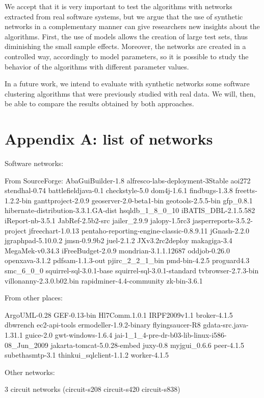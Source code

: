 We accept that it is very important to test the algorithms with networks
extracted from real software systems, but we argue that the use of synthetic
networks in a complementary manner can give researchers new insights about the
algorithms. First, the use of models allows the creation of large test sets,
thus diminishing the small sample effects. Moreover, the networks are created in
a controlled way, accordingly to model parameters, so it is possible to study
the behavior of the algorithms with different parameter values.

In a future work, we intend to evaluate with synthetic networks some software
clustering algorithms that were previously studied with real data. We will,
then, be able to compare the results obtained by both approaches. \cite{Wu2005}

\section{Appendix A: list of networks}

Software networks:

From SourceForge:
AbaGuiBuilder-1.8
alfresco-labs-deployment-3Stable
aoi272
stendhal-0.74
battlefieldjava-0.1
checkstyle-5.0
dom4j-1.6.1
findbugs-1.3.8
freetts-1.2.2-bin
ganttproject-2.0.9
geoserver-2.0-beta1-bin
geotools-2.5.5-bin
gfp\_0.8.1
hibernate-distribution-3.3.1.GA-dist
hsqldb\_1\_8\_0\_10
iBATIS\_DBL-2.1.5.582
iReport-nb-3.5.1
JabRef-2.5b2-src
jailer\_2.9.9
jalopy-1.5rc3
jasperreports-3.5.2-project
jfreechart-1.0.13
pentaho-reporting-engine-classic-0.8.9.11
jGnash-2.2.0
jgraphpad-5.10.0.2
jmsn-0.9.9b2
juel-2.1.2
JXv3.2rc2deploy
makagiga-3.4
MegaMek-v0.34.3
iFreeBudget-2.0.9
mondrian-3.1.1.12687
oddjob-0.26.0
openxava-3.1.2
pdfsam-1.1.3-out
pjirc\_2\_2\_1\_bin
pmd-bin-4.2.5
proguard4.3
smc\_6\_0\_0
squirrel-sql-3.0.1-base
squirrel-sql-3.0.1-standard
tvbrowser-2.7.3-bin
villonanny-2.3.0.b02.bin
rapidminer-4.4-community
zk-bin-3.6.1

From other places:

ArgoUML-0.28
GEF-0.13-bin
Hl7Comm.1.0.1
IRPF2009v1.1
broker-4.1.5
dbwrench
ec2-api-tools
ermodeller-1.9.2-binary
flyingsaucer-R8
gdata-src.java-1.31.1
guice-2.0
gwt-windows-1.6.4
jai-1\_1\_4-pre-dr-b03-lib-linux-i586-08\_Jun\_2009
jakarta-tomcat-5.0.28-embed
juxy-0.8
myjgui\_0.6.6
peer-4.1.5
subethasmtp-3.1
thinkui\_sqlclient-1.1.2
worker-4.1.5

Other networks:

3 circuit networks (circuit-s208 circuit-s420 circuit-s838)

